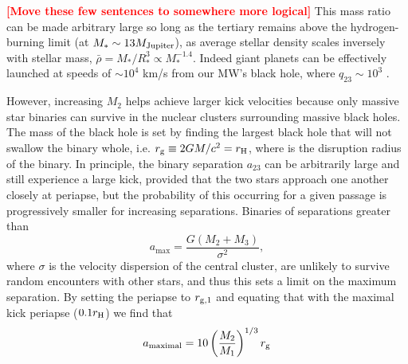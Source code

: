 \documentclass[a4paper,twocolumn]{emulateapj}
\newcommand{\colr}[1]{{\bf \textcolor{red}{[#1]}}}
\begin{document}
\colr{Move these few sentences to somewhere more logical} This mass ratio can be made arbitrary large so long as the tertiary remains above the hydrogen-burning limit (at $M_{\ast} \sim 13 M_{\rm Jupiter}$), as average stellar density scales inversely with stellar mass, $\bar{\rho} = M_\ast / R_\ast^3 \propto M_\ast^{-1.4}$. Indeed giant planets can be effectively launched at speeds of $\sim 10^{4}$ km/s from our MW's black hole, where $q_{23} \sim 10^{3}$ \citep{Ginsburg:2012a}.

However, increasing $M_{2}$ helps achieve larger kick velocities because only massive star binaries can survive in the nuclear clusters surrounding massive black holes. The mass of the black hole is set by finding the largest black hole that will not swallow the binary whole, i.e. $r_{\rm g} \equiv 2 G M / c^{2} = r_{\rm H}$, where  is the disruption radius of the binary. In principle, the binary separation $a_{23}$ can be arbitrarily large and still experience a large kick, provided that the two stars approach one another closely at periapse, but the probability of this occurring for a given passage is progressively smaller for increasing separations. Binaries of separations greater than
\begin{equation}
a_{\max} = \frac{G \left(M_{2} + M_{3}\right)}{\sigma^2},\label{eq:amax}
\end{equation}
where $\sigma$ is the velocity dispersion of the central cluster, are unlikely to survive random encounters with other stars, and thus this sets a limit on the maximum separation. By setting the periapse to $r_{\rm g,1}$ and equating that with the maximal kick periapse ($0.1 r_{\rm H}$) we find that
\begin{equation}
a_{\rm maximal} = 10 \left(\frac{M_2}{M_1}\right)^{1/3} r_{\rm g}\label{eq:amaximal}
\end{equation}
\end{document}

